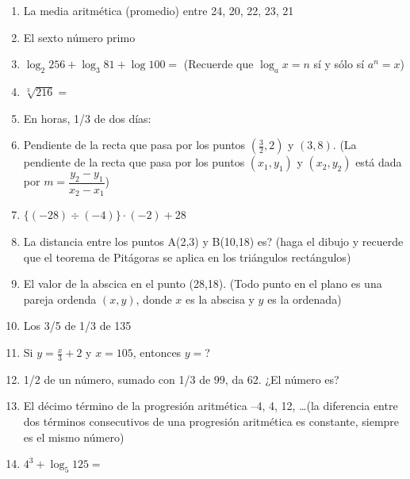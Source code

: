 \documentclass[11pt,twoside,letter]{article}
\begin{document}
\begin{enumerate}
 \item La media aritmética (promedio) entre 24, 20, 22, 23, 21
 \item El sexto número primo
 \item $\log_{2}256+\log_{3}81+\log100=$ (Recuerde que $\log_{a}x=n$ s\'{i} y s\'{o}lo s\'{i} $a^{n}=x$)
 \item $\sqrt[3]{216}=$
 \item En horas, 1/3 de dos días:
 \item Pendiente de la recta que pasa por los puntos $\left(\frac{3}{2},2\right)$ y $(3,8)$. (La pendiente de la recta que pasa por los puntos $(x_{1},y_{1})$ y $(x_{2},y_{2})$ está dada por $m=\dfrac{y_{2}-y_{1}}{x_{2}-x_{1}}$)
 \item $\{(-28)\div(-4)\}\cdot(-2)+28$
 \item La distancia entre los puntos A(2,3) y B(10,18) es? (haga el dibujo y recuerde que el teorema de Pitágoras se aplica en los triángulos rectángulos)
 \item El valor de la abscica en el punto (28,18). (Todo punto en el plano es una pareja ordenda $(x,y)$, donde $x$ es la abscisa y $y$ es la ordenada)
 \item Los 3/5 de 1/3 de 135
 \item Si $y=\frac{x}{3}+2$ \; y \; $x=105$, entonces $y=$?
 \item 1/2 de un número, sumado con 1/3 de 99, da 62. ¿El número es?
 \item El décimo término de la progresión aritmética --4, 4, 12, \ldots (la diferencia entre dos términos consecutivos de una progresión aritmética es constante, siempre es el mismo número)
 \item $4^{3}+\log_{5}125=$
\end{enumerate}
\end{document}

